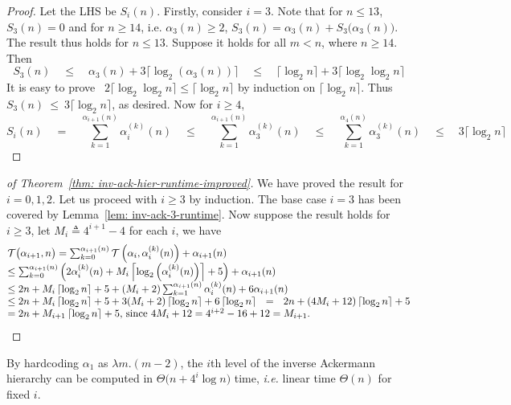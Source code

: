 \begin{proof}
	Let the LHS be $S_i(n)$. Firstly, consider $i = 3$. Note that for $n\le 13$, $S_3(n) = 0$ and for $n\ge 14$, i.e. $\alpha_3(n)\ge 2$, $S_3(n) = \alpha_3(n) + S_3\big(\alpha_3(n)\big)$. The result thus holds for $n\le 13$. Suppose it holds for all $m < n$, where $n\ge 14$. Then
	\begin{equation*}
	S_3(n) \quad \le \quad \alpha_3(n) + 3\big\lceil \log_2(\alpha_3(n)) \big\rceil \quad \le \quad \big\lceil \log_2n \big\rceil + 3\big\lceil \log_2\log_2n \big\rceil
	\end{equation*}
	It is easy to prove \, $2\big\lceil \log_2\log_2n \big\rceil \le \big\lceil \log_2n \big\rceil$ by induction on $\big\lceil \log_2n \big\rceil$. Thus $S_3(n)~\le~3\big\lceil \log_2n \big\rceil$, as desired. Now for $i \ge 4$,
	\begin{equation*}
	S_i(n) \quad = \quad \sum_{k=1}^{\alpha_{i+1}(n)} \alpha_i^{(k)}(n) \quad \le \quad
	\sum_{k=1}^{\alpha_{i+1}(n)} \alpha_3^{(k)}(n) \quad \le \quad
	\sum_{k=1}^{\alpha_{4}(n)} \alpha_3^{(k)}(n) \quad \le \quad
	3\big\lceil \log_2n \big\rceil
	\end{equation*}
\end{proof}
\begin{proof}[of Theorem~\ref{thm: inv-ack-hier-runtime-improved}]
	We have proved the result for $i = 0, 1, 2$. Let us proceed with $i\ge 3$ by induction. The base case $i = 3$ has been covered by Lemma~\ref{lem: inv-ack-3-runtime}. Now suppose the result holds for $i\ge 3$, let $M_i \triangleq 4^{i+1}-4$ for each $i$, we have
	\begin{equation*}
	\begin{array}{@{}l@{}}
	 \runtime\big(\alpha_{i+1}, n\big) = \sum_{k=0}^{\alpha_{i+1}(n)} \runtime\left(\alpha_i, \alpha_i^{(k)}(n)\right) + \alpha_{i+1}(n) \\
	\le \sum_{k=0}^{\alpha_{i+1}(n)}\left(2\alpha_i^{(k)}(n) + M_i\left\lceil\log_2\left(\alpha_i^{(k)}(n)\right)\right\rceil + 5 \right) + \alpha_{i+1}(n) \\
	\le 2n + M_i\left\lceil\log_2n\right\rceil + 5 + (M_i+2)\sum_{k=1}^{\alpha_{i+1}(n)}\alpha_i^{(k)}(n) + 6\alpha_{i+1}(n) \\
	\le 2n + M_i\left\lceil\log_2n\right\rceil + 5 +
	3(M_i + 2)\left\lceil\log_2n\right\rceil + 6\left\lceil\log_2n\right\rceil ~~
	= ~~ 2n + (4M_i + 12)\left\lceil\log_2n\right\rceil + 5 \\
	= 2n + M_{i+1}\left\lceil\log_2n\right\rceil + 5\text{, since $4M_i + 12 = 4^{i+2} - 16 + 12 = M_{i+1}$}.
	\end{array}
	\end{equation*}
\end{proof}
By hardcoding $\alpha_1$ as $\lambda m.(m-2)$, the $i$th level of the inverse Ackermann hierarchy can be computed in $\Theta\big(n + 4^i\log n\big)$ time, \emph{i.e.} linear time $\Theta(n)$ for fixed $i$.


